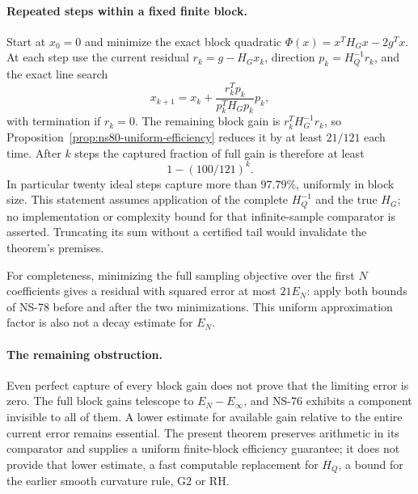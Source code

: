 \paragraph{Repeated steps within a fixed finite block.}
Start at $x_0=0$ and minimize the exact block quadratic
$\Phi(x)=x^TH_Gx-2g^Tx$. At each step use the current residual
$r_k=g-H_Gx_k$, direction $p_k=H_Q^{-1}r_k$, and the exact line search
\[
 x_{k+1}=x_k+\frac{r_k^Tp_k}{p_k^TH_Gp_k}p_k,
\]
with termination if $r_k=0$. The remaining block gain is
$r_k^TH_G^{-1}r_k$, so Proposition~\ref{prop:ns80-uniform-efficiency}
reduces it by at least $21/121$ each time. After $k$ steps the captured
fraction of full gain is therefore at least
\[
 1-(100/121)^k.
\]
In particular twenty ideal steps capture more than $97.79\%$, uniformly
in block size. This statement assumes application of the complete
$H_Q^{-1}$ and the true $H_G$; no implementation or complexity bound for
that infinite-sample comparator is asserted. Truncating its sum without
a certified tail would invalidate the theorem's premises.

For completeness, minimizing the full sampling objective over the first
$N$ coefficients gives a residual with squared error at most $21E_N$:
apply both bounds of NS-78 before and after the two minimizations.
This uniform approximation factor is also not a decay estimate for $E_N$.

\paragraph{The remaining obstruction.}
Even perfect capture of every block gain does not prove that the limiting
error is zero. The full block gains telescope to $E_N-E_\infty$, and
NS-76 exhibits a component invisible to all of them. A lower estimate
for available gain relative to the entire current error remains essential.
The present theorem preserves arithmetic in its comparator and supplies a
uniform finite-block efficiency guarantee; it does not provide that lower
estimate, a fast computable replacement for $H_Q$, a bound for the earlier
smooth curvature rule, G2 or RH.
